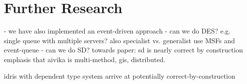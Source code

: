 \section{Further Research}
- we have also implemented an event-driven approach
- can we do DES? e.g. single queue with multiple servers? also specialist vs. generalist use MSFs and event-queue
- can we do SD? towards paper: sd is nearly correct by construction
emphasis that aivika is multi-method, gis, distributed. 

idris with dependent type system arrive at potentially correct-by-construction